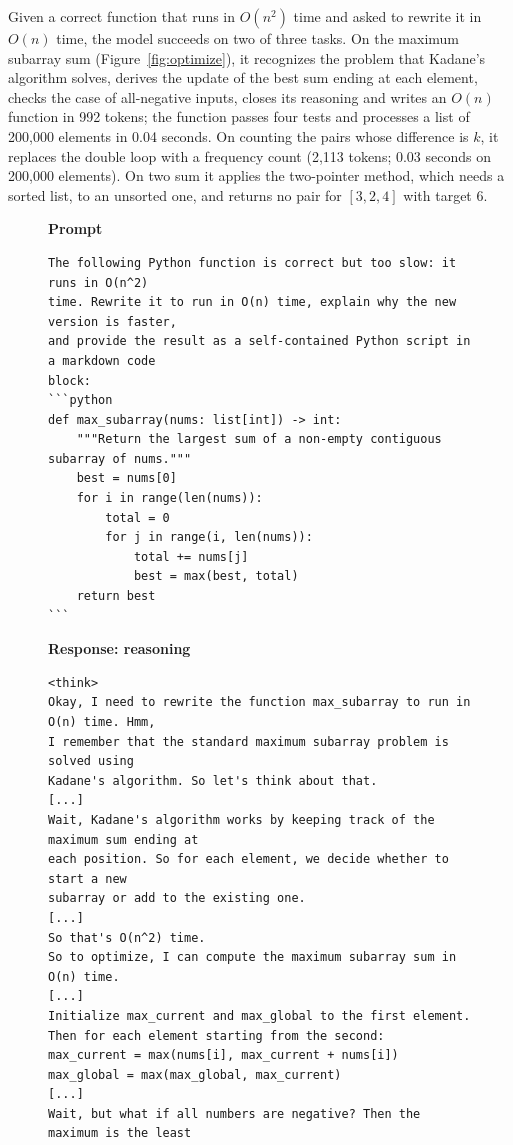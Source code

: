 \documentclass[sigconf,nonacm,balance=false]{acmart}
\begin{document}
Given a correct function that runs in $O(n^2)$ time and asked to rewrite it in $O(n)$ time, the model succeeds on two
of three tasks. On the maximum subarray sum (Figure~\ref{fig:optimize}), it recognizes the problem that Kadane's
algorithm solves, derives the update of the best sum ending at each element, checks the case of all-negative inputs,
closes its reasoning and writes an $O(n)$ function in 992 tokens; the function passes four tests and processes a list
of 200,000 elements in 0.04 seconds. On counting the pairs whose difference is $k$, it replaces the double loop with a
frequency count (2,113 tokens; 0.03 seconds on 200,000 elements). On two sum it applies the two-pointer method, which
needs a sorted list, to an unsorted one, and returns no pair for $[3, 2, 4]$ with target 6.
\begin{figure}
  \centering
  \begin{minipage}[t]{0.49\textwidth}
    \scriptsize
    \textbf{Prompt}\vspace{-0.5em}
\begin{verbatim}
The following Python function is correct but too slow: it runs in O(n^2)
time. Rewrite it to run in O(n) time, explain why the new version is faster,
and provide the result as a self-contained Python script in a markdown code
block:
```python
def max_subarray(nums: list[int]) -> int:
    """Return the largest sum of a non-empty contiguous subarray of nums."""
    best = nums[0]
    for i in range(len(nums)):
        total = 0
        for j in range(i, len(nums)):
            total += nums[j]
            best = max(best, total)
    return best
```
\end{verbatim}
    \vspace{-0.5em}\textbf{Response: reasoning}\vspace{-0.5em}
\begin{verbatim}
<think>
Okay, I need to rewrite the function max_subarray to run in O(n) time. Hmm,
I remember that the standard maximum subarray problem is solved using
Kadane's algorithm. So let's think about that.
[...]
Wait, Kadane's algorithm works by keeping track of the maximum sum ending at
each position. So for each element, we decide whether to start a new
subarray or add to the existing one.
[...]
So that's O(n^2) time.
So to optimize, I can compute the maximum subarray sum in O(n) time.
[...]
Initialize max_current and max_global to the first element.
Then for each element starting from the second:
max_current = max(nums[i], max_current + nums[i])
max_global = max(max_global, max_current)
[...]
Wait, but what if all numbers are negative? Then the maximum is the least

\end{verbatim}
\end{minipage}
\end{figure}
\end{document}

